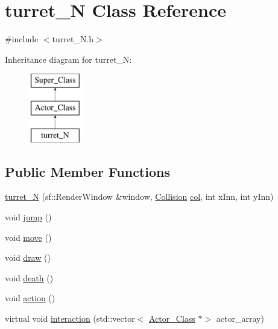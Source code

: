 \hypertarget{classturret___n}{}\section{turret\+\_\+N Class Reference}
\label{classturret___n}


{\ttfamily \#include $<$turret\+\_\+\+N.\+h$>$}

Inheritance diagram for turret\+\_\+N\+:\begin{figure}[H]
\begin{center}
\leavevmode
\includegraphics[height=3.000000cm]{classturret___n}
\end{center}
\end{figure}
\subsection*{Public Member Functions}
\begin{DoxyCompactItemize}
\item 
\hyperlink{classturret___n_a3025a90c280327763fe979a5e36aada3}{turret\+\_\+N} (sf\+::\+Render\+Window \&window, \hyperlink{class_collision}{Collision} \hyperlink{classturret___n_a47ca04d396895b039912283c18455ef1}{col}, int x\+Inn, int y\+Inn)
\item 
void \hyperlink{classturret___n_aec518dd6dacf05d1af45e6713a15ea5d}{jump} ()
\item 
void \hyperlink{classturret___n_ac8ad5be9e03657d090a45f6198812f35}{move} ()
\item 
void \hyperlink{classturret___n_a2f584be23fc5f0e44fbfda79bc3733b7}{draw} ()
\item 
void \hyperlink{classturret___n_a8004a2fe2a3ab77b0da93ef0e26635ce}{death} ()
\item 
void \hyperlink{classturret___n_a888cc034380c572a17a38e0f3c2fb9bd}{action} ()
\item 
virtual void \hyperlink{classturret___n_a33cfa60542db12f35678ebc3d479491f}{interaction} (std\+::vector$<$ \hyperlink{class_actor___class}{Actor\+\_\+\+Class} $\ast$$>$ actor\+\_\+array)
\end{DoxyCompactItemize}
